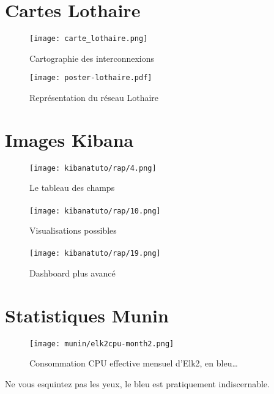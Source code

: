 \section{Cartes Lothaire}
\begin{figure}[H]
    \center
    \texttt{[image: carte\_lothaire.png]}
    \label{fig:imagereseaulothaire1}
    \caption{Cartographie des interconnexions}
\end{figure}
\begin{figure}[H]
    \center
    \texttt{[image: poster-lothaire.pdf]}
    \label{fig:imagereseaulothaire2}
    \caption{Représentation du réseau Lothaire}
\end{figure}


\section{Images Kibana}
\begin{figure}[H]
\center
\texttt{[image: kibanatuto/rap/4.png]}
\label{fig:kibanatuto4}
\caption{Le tableau des champs}
\end{figure}

\paragraph{}
\begin{figure}[H]
\center
\texttt{[image: kibanatuto/rap/10.png]}
\label{fig:kibanatuto7}
\caption{Visualisations possibles}
\end{figure}
\paragraph{}
\begin{figure}[H]
\center
\texttt{[image: kibanatuto/rap/19.png]}
\label{fig:kibanatuto12}
\caption{Dashboard plus avancé}
\end{figure}

\section{Statistiques Munin}
\begin{figure}[H]
\center
\texttt{[image: munin/elk2cpu-month2.png]}
\label{fig:elk2cpu}
\caption{Consommation CPU effective mensuel d'Elk2, en bleu\ldots}
\end{figure}
Ne vous esquintez pas les yeux, le bleu est pratiquement indiscernable.

